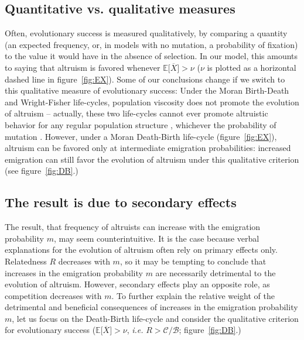 \documentclass[11pt, letterpaper]{article}
\newcommand{\ie}{\textit{i.e.}}
\newcommand{\Esp}[1]{\mathbb{E}\big[ #1\big]}%
\newcommand{\mutbias}{\nu}
\begin{document}
\subsection*{Quantitative vs. qualitative measures}
Often, evolutionary success is measured qualitatively, by comparing a quantity (an expected frequency, or, in models with no mutation, a probability of fixation) to the value it would have in the absence of selection. In our model, this amounts to saying that altruism is favored whenever $\Esp{\overline{X}} > \mutbias$ ($\mutbias$ is plotted as a horizontal dashed line in figure~\ref{fig:EX}). 
Some of our conclusions change if we switch to this qualitative measure of evolutionary success: Under the Moran Birth-Death and Wright-Fisher life-cycles, population viscosity does not promote the evolution of altruism -- actually, these two life-cycles cannot ever promote altruistic behavior for any regular population structure \citep{Taylor2011}, whichever the probability of mutation \citep{Debarre2017}. 
However, under a Moran Death-Birth life-cycle (figure~\ref{fig:EX}), altruism can be favored only at intermediate emigration probabilities: increased emigration can still favor the evolution of altruism under this qualitative criterion (see figure~\ref{fig:DB}.)  

\subsection*{The result is due to secondary effects}
The result, that frequency of altruists can increase with the emigration probability $m$, may seem counterintuitive. It is the case because verbal explanations for the evolution of altruism often rely on primary effects only. Relatedness $R$ decreases with $m$, so it may be tempting to conclude that increases in the emigration probability $m$ are necessarily detrimental to the evolution of altruism. However, secondary effects play an opposite role, as competition decreases with $m$. To further explain the relative weight of the detrimental and beneficial consequences of increases in the emigration probability $m$, let us focus on the Death-Birth life-cycle and consider the qualitative criterion for evolutionary success ($\Esp{\overline{X}}>\nu$, \ie{} $R > \mathcal{C}/\mathcal{B}$; figure~\ref{fig:DB}.)
\end{document}
